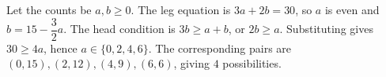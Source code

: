 Let the counts be $a,b\ge0$. The leg equation is $3a+2b=30$, so $a$ is even and $b=15-\dfrac{3}{2}a$. The head condition is $3b\ge a+b$, or $2b\ge a$. Substituting gives $30\ge4a$, hence $a\in\{0,2,4,6\}$. The corresponding pairs are $(0,15),(2,12),(4,9),(6,6)$, giving $\boxed4$ possibilities.
